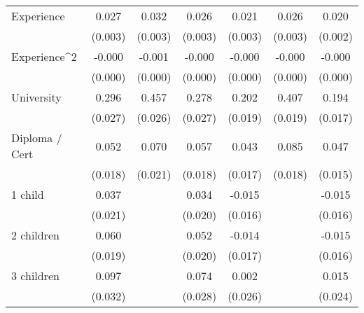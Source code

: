 {\begin{tabular}{l*{6}{c}}
Experience          &       0.027\sym{***}&       0.032\sym{***}&       0.026\sym{***}&       0.021\sym{***}&       0.026\sym{***}&       0.020\sym{***}\\
                    &     (0.003)         &     (0.003)         &     (0.003)         &     (0.003)         &     (0.003)         &     (0.002)         \\
Experience^{2}      &      -0.000\sym{***}&      -0.001\sym{***}&      -0.000\sym{***}&      -0.000\sym{***}&      -0.000\sym{***}&      -0.000\sym{***}\\
                    &     (0.000)         &     (0.000)         &     (0.000)         &     (0.000)         &     (0.000)         &     (0.000)         \\
University          &       0.296\sym{***}&       0.457\sym{***}&       0.278\sym{***}&       0.202\sym{***}&       0.407\sym{***}&       0.194\sym{***}\\
                    &     (0.027)         &     (0.026)         &     (0.027)         &     (0.019)         &     (0.019)         &     (0.017)         \\
Diploma / Cert      &       0.052\sym{***}&       0.070\sym{***}&       0.057\sym{***}&       0.043\sym{**} &       0.085\sym{***}&       0.047\sym{***}\\
                    &     (0.018)         &     (0.021)         &     (0.018)         &     (0.017)         &     (0.018)         &     (0.015)         \\
1 child             &       0.037\sym{*}  &                     &       0.034\sym{*}  &      -0.015         &                     &      -0.015         \\
                    &     (0.021)         &                     &     (0.020)         &     (0.016)         &                     &     (0.016)         \\
2 children          &       0.060\sym{***}&                     &       0.052\sym{**} &      -0.014         &                     &      -0.015         \\
                    &     (0.019)         &                     &     (0.020)         &     (0.017)         &                     &     (0.016)         \\
3 children          &       0.097\sym{***}&                     &       0.074\sym{***}&       0.002         &                     &       0.015         \\
                    &     (0.032)         &                     &     (0.028)         &     (0.026)         &                     &     (0.024)         \\

\end{tabular}}
